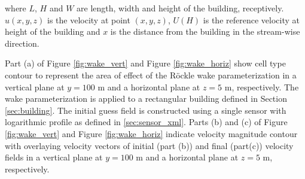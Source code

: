 where $L$, $H$ and $W$ are length, width and height of the building, receptively. $u(x,y,z)$ is the velocity at point $(x,y,z)$, $U(H)$ is the reference velocity at height of the building and $x$ is the distance from the building in the stream-wise direction.

Part (a) of Figure \ref{fig:wake_vert} and Figure \ref{fig:wake_horiz} show cell type contour to represent the area of effect of the R\"{o}ckle wake parameterization in a vertical plane at $y=100$ m and a horizontal plane at $z=5$ m, respectively. The wake parameterization is applied to a rectangular building defined in Section \ref{sec:building}. The initial guess field is constructed using a single sensor with logarithmic profile as defined in \ref{sec:sensor_xml}. Parts (b) and (c) of Figure \ref{fig:wake_vert} and Figure \ref{fig:wake_horiz} indicate velocity magnitude contour with overlaying velocity vectors of initial (part (b)) and final (part(c)) velocity fields in a vertical plane at $y=100$ m and a horizontal plane at $z=5$ m, respectively.

